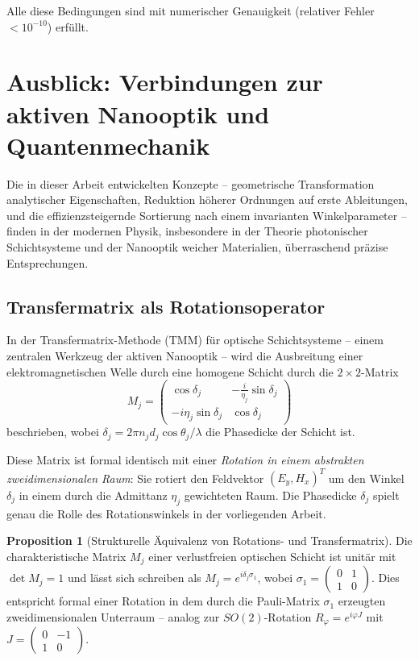 ﻿\documentclass[12pt, a4paper]{article}
\theoremstyle{definition}
\newtheorem{proposition}{Proposition}[section]
\begin{document}
	Alle diese Bedingungen sind mit numerischer Genauigkeit (relativer Fehler $< 10^{-10}$) erfüllt.
	
	\section{Ausblick: Verbindungen zur aktiven Nanooptik und Quantenmechanik}
	\label{sec:ausblick}
	
	Die in dieser Arbeit entwickelten Konzepte -- geometrische Transformation
	analytischer Eigenschaften, Reduktion höherer Ordnungen auf erste Ableitungen,
	und die effizienzsteigernde Sortierung nach einem invarianten Winkelparameter --
	finden in der modernen Physik, insbesondere in der Theorie photonischer
	Schichtsysteme und der Nanooptik weicher Materialien, überraschend präzise
	Entsprechungen.
	
	\subsection{Transfermatrix als Rotationsoperator}
	
	In der Transfermatrix-Methode (TMM) für optische Schichtsysteme --
	einem zentralen Werkzeug der aktiven Nanooptik \cite{oqtum} --
	wird die Ausbreitung einer elektromagnetischen Welle durch eine homogene
	Schicht durch die $2\times 2$-Matrix
	\[
	M_j = \begin{pmatrix}
		\cos\delta_j & -\frac{i}{\eta_j}\sin\delta_j \\
		-i\eta_j\sin\delta_j & \cos\delta_j
	\end{pmatrix}
	\]
	beschrieben, wobei $\delta_j = 2\pi n_j d_j \cos\theta_j / \lambda$ die
	Phasedicke der Schicht ist.
	
	Diese Matrix ist formal identisch mit einer \emph{Rotation in einem
		abstrakten zweidimensionalen Raum}: Sie rotiert den Feldvektor
	$(E_y, H_x)^T$ um den Winkel $\delta_j$ in einem durch die Admittanz
	$\eta_j$ gewichteten Raum. Die Phasedicke $\delta_j$ spielt genau die Rolle
	des Rotationswinkels in der vorliegenden Arbeit.
	
	\begin{proposition}[Strukturelle Äquivalenz von Rotations- und Transfermatrix]
		\label{prop:aequivalenz}
		Die charakteristische Matrix $M_j$ einer verlustfreien optischen Schicht
		ist unitär mit $\det M_j = 1$ und lässt sich schreiben als
		$M_j = e^{i\delta_j \sigma_1}$, wobei $\sigma_1 = \begin{pmatrix}0&1\\1&0\end{pmatrix}$.
		Dies entspricht formal einer Rotation in dem durch die Pauli-Matrix $\sigma_1$
		erzeugten zweidimensionalen Unterraum -- analog zur $SO(2)$-Rotation
		$R_\varphi = e^{i\varphi J}$ mit $J = \begin{pmatrix}0&-1\\1&0\end{pmatrix}$.
	\end{proposition}
	
\end{document}
